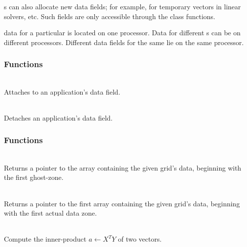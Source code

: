 \documentclass[11pt]{article}
\begin{document}
   s can also allocate new data fields; for example, for
   temporary vectors in linear solvers, etc.  Such fields are only
   accessible through the  class functions.

    data for a particular  is located on one
   processor.  Data for different s can be on different
   processors.  Different data fields for the same  lie on the
   same processor.

   \umlVector

\subsubsection{ Functions}

     \\
    Attaches to an application's data field.

     \\
    Detaches an application's data field.

\subsubsection{ Functions}

     \\
    Returns a pointer to the array containing the given grid's data,
    beginning with the first ghost-zone.

     \\
    Returns a pointer to the first array containing the given grid's
    data, beginning with the first actual data zone.

     \\
    Compute the inner-product $a \leftarrow X^T Y$ of two vectors.
\end{document}
